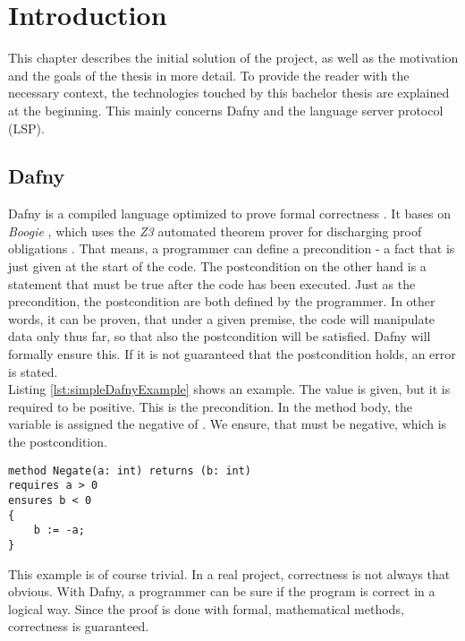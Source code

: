 \section{Introduction}

\label{section:introduction}
This chapter describes the initial solution of the project, as well as the motivation and the goals of the thesis in more detail.
To provide the reader with the necessary context, the technologies touched by this bachelor thesis are explained at the beginning.
This mainly concerns Dafny and the language server protocol (LSP).

\subsection{Dafny}
\label{section:introduction:dafny}
Dafny is a compiled language optimized to prove formal correctness \cite{dafnyWiki}.
It bases on \textit{Boogie} \cite{boogie}, which uses the \textit{Z3} \cite{z3} automated theorem prover for discharging proof obligations \cite{dafnyWiki}.
That means, a programmer can define a precondition - a fact that is just given at the start of the code.
The postcondition on the other hand is a statement that must be true after the code has been executed.
Just as the precondition, the postcondition are both defined by the programmer.
In other words, it can be proven, that under a given premise, the code will manipulate data only thus far, so that also the postcondition will be satisfied.
Dafny will formally ensure this.
If it is not guaranteed that the postcondition holds, an error is stated.\\

Listing \ref{lst:simpleDafnyExample} shows an example.
The value  is given, but it is required to be positive.
This is the precondition.
In the method body, the variable  is assigned the negative of .
We ensure, that  must be negative, which is the postcondition.
\begin{lstlisting}[language=dafny, caption={Simple Dafny Example}, captionpos=b, label={lst:simpleDafnyExample}]
method Negate(a: int) returns (b: int)
requires a > 0
ensures b < 0
{
    b := -a;
}
\end{lstlisting}
This example is of course trivial.
In a real project, correctness is not always that obvious.
With Dafny, a programmer can be sure if the program is correct in a logical way.
Since the proof is done with formal, mathematical methods, correctness is guaranteed.\\

